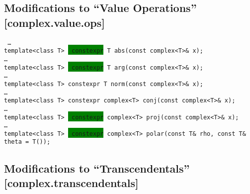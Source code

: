 \documentclass[prd,twocolumn,amsmath,amssymb,nofootinbib,eqsecnum]{revtex4-1}
\newcommand{\code}[1]{{\tt #1}}
\newcommand{\highlight}[1]{\colorbox{green}{\!\!\!\! #1}}
\begin{document}
\subsection{Modifications to ``Value Operations'' [complex.value.ops]}

\code{
	\ldots\\

	template<class T> \highlight{constexpr} T abs(const complex<T>\& x);\\

 	\ldots\\

	template<class T> \highlight{constexpr} T arg(const complex<T>\& x);\\

	\ldots\\

	template<class T> constexpr T norm(const complex<T>\& x);\\

	\ldots\\

	template<class T> constexpr complex<T> conj(const complex<T>\& x);\\

	\ldots\\

	template<class T> \highlight{constexpr} complex<T> proj(const complex<T>\& x);\\

	\ldots\\

	template<class T> \highlight{constexpr} complex<T> polar(const T\& rho, const T\& theta = T());	
}

\subsection{Modifications to ``Transcendentals'' [complex.transcendentals]}
\end{document}

